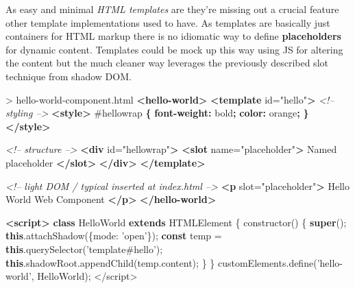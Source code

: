 \documentclass[]{article}
\newenvironment{Shaded}{}{}
\newcommand{\KeywordTok}[1]{\textcolor[rgb]{0.00,0.44,0.13}{\textbf{{#1}}}}
\newcommand{\DataTypeTok}[1]{\textcolor[rgb]{0.56,0.13,0.00}{{#1}}}
\newcommand{\FloatTok}[1]{\textcolor[rgb]{0.25,0.63,0.44}{{#1}}}
\newcommand{\StringTok}[1]{\textcolor[rgb]{0.25,0.44,0.63}{{#1}}}
\newcommand{\SpecialStringTok}[1]{\textcolor[rgb]{0.73,0.40,0.53}{{#1}}}
\newcommand{\CommentTok}[1]{\textcolor[rgb]{0.38,0.63,0.69}{\textit{{#1}}}}
\newcommand{\OtherTok}[1]{\textcolor[rgb]{0.00,0.44,0.13}{{#1}}}
\newcommand{\VariableTok}[1]{\textcolor[rgb]{0.10,0.09,0.49}{{#1}}}
\newcommand{\OperatorTok}[1]{\textcolor[rgb]{0.40,0.40,0.40}{{#1}}}
\newcommand{\AttributeTok}[1]{\textcolor[rgb]{0.49,0.56,0.16}{{#1}}}
\newcommand{\NormalTok}[1]{{#1}}
\begin{document}
As easy and minimal \emph{HTML templates} are they're missing out a
crucial feature other template implementations used to have. As
templates are basically just containers for HTML markup there is no
idiomatic way to define \textbf{placeholders} for dynamic content.
Templates could be mock up this way using JS for altering the content
but the much cleaner way leverages the previously described slot
technique from shadow DOM.

\begin{Shaded}
\begin{Highlighting}[]
\NormalTok{> hello-world-component.html}
\KeywordTok{<hello-world>}
  \KeywordTok{<template}\OtherTok{ id=}\StringTok{"hello"}\KeywordTok{>}
  \CommentTok{<!-- styling -->}
    \KeywordTok{<style>}
      \FloatTok{#hellowrap} \KeywordTok{\{}
        \KeywordTok{font-weight:} \DataTypeTok{bold}\KeywordTok{;}
        \KeywordTok{color:} \NormalTok{orange}\KeywordTok{;}
      \KeywordTok{\}}
    \KeywordTok{</style>}
    
    \CommentTok{<!-- structure -->}
    \KeywordTok{<div}\OtherTok{ id=}\StringTok{"hellowrap"}\KeywordTok{>}
      \KeywordTok{<slot}\OtherTok{ name=}\StringTok{"placeholder"}\KeywordTok{>}
        \NormalTok{Named placeholder}
      \KeywordTok{</slot>}
    \KeywordTok{</div>}
  \KeywordTok{</template>}
  
  \CommentTok{<!-- light DOM / typical inserted at index.html -->}
  \KeywordTok{<p}\OtherTok{ slot=}\StringTok{"placeholder"}\KeywordTok{>}
    \NormalTok{Hello World Web Component}
  \KeywordTok{</p>}
\KeywordTok{</hello-world>}

\KeywordTok{<script>}
  \KeywordTok{class} \NormalTok{HelloWorld }\KeywordTok{extends} \NormalTok{HTMLElement }\OperatorTok{\{}
    \AttributeTok{constructor}\NormalTok{() }\OperatorTok{\{}
      \KeywordTok{super}\NormalTok{()}\OperatorTok{;}
      \KeywordTok{this}\NormalTok{.}\AttributeTok{attachShadow}\NormalTok{(}\OperatorTok{\{}\DataTypeTok{mode}\OperatorTok{:} \StringTok{'open'}\OperatorTok{\}}\NormalTok{)}\OperatorTok{;}
      \KeywordTok{const} \NormalTok{temp }\OperatorTok{=} \KeywordTok{this}\NormalTok{.}\AttributeTok{querySelector}\NormalTok{(}\StringTok{'template#hello'}\NormalTok{)}\OperatorTok{;}
      \KeywordTok{this}\NormalTok{.}\VariableTok{shadowRoot}\NormalTok{.}\AttributeTok{appendChild}\NormalTok{(}\VariableTok{temp}\NormalTok{.}\AttributeTok{content}\NormalTok{)}\OperatorTok{;}
    \OperatorTok{\}}
  \OperatorTok{\}}
  \VariableTok{customElements}\NormalTok{.}\AttributeTok{define}\NormalTok{(}\StringTok{'hello-world'}\OperatorTok{,} \NormalTok{HelloWorld)}\OperatorTok{;}
\OperatorTok{<}\SpecialStringTok{/script>}
\end{Highlighting}
\end{Shaded}
\end{document}
